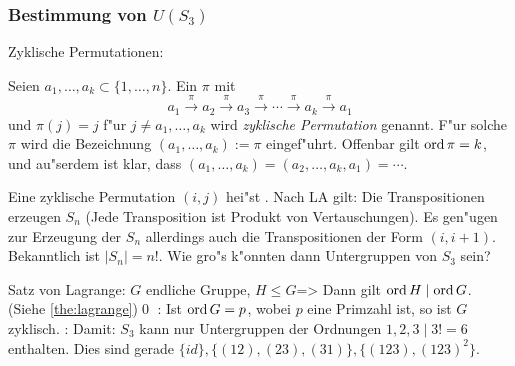 \subsubsection*{Bestimmung von $U(S_3)$}
\example Zyklische Permutationen:{
  Seien $a_1,\ldots,a_k\subset\{1,\ldots,n\}$.  Ein $\pi$ mit 
  \[a_1\overset \pi\to a_2 \overset \pi\to a_3\overset \pi\to \cdots \overset \pi\to a_k \overset \pi\to a_1
    \]
  und $\pi(j)=j$ f"ur $j\neq a_1,\ldots,a_k$ wird \emph{zyklische Permutation} genannt.
  F"ur solche $\pi$ wird die Bezeichnung $(a_1,\ldots,a_k):=\pi$ eingef"uhrt. Offenbar
  gilt $\operatorname{ord} \pi =k$, und au"serdem ist klar, dass 
  $(a_1,\ldots,a_k)=(a_2,\ldots,a_k,a_1)=\cdots$.
  
  Eine zyklische Permutation $(i,j)$ hei"st \emph{}.
  Nach LA gilt: Die Transpositionen erzeugen $S_n$ (Jede Transposition
  ist Produkt von Vertauschungen). Es gen"ugen zur Erzeugung der $S_n$ 
  allerdings auch die Transpositionen der Form $(i,i+1)$. Bekanntlich 
  ist $|S_n|=n!$. Wie gro"s k"onnten dann Untergruppen von $S_3$ sein?
  }
\theorem Satz von Lagrange:
  $G$ endliche Gruppe, $H\leq G$=>{
  Dann gilt $\operatorname{ord} H\mid \operatorname{ord} G$. (Siehe \ref{the:lagrange})\qed
  }
\remark:{
  Ist $\operatorname{ord} G=p$, wobei $p$ eine Primzahl ist, so ist $G$ zyklisch.
  }
\remark:{
  Damit: $S_3$ kann nur Untergruppen der Ordnungen $1,2,3\mid 3!=6$ enthalten.
  Dies sind gerade $\{id\},\{(12),(23),(31)\},\{(123),(123)^2\}$.
  }
